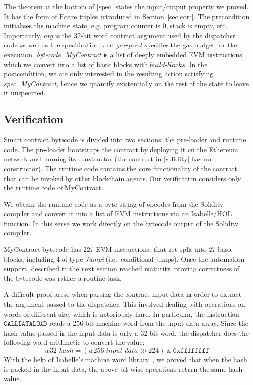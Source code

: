 \documentclass[sigplan,10pt,review]{acmart}\settopmatter{printfolios=true,printccs=false,printacmref=false}
\newcommand{\gaspred}{\mathit{gas\mbox{-}pred}}
\newcommand{\instr}[1]{\mathtt{#1}}
\newcommand{\bblocks}{\mathit{build\mbox{-}blocks}}
\begin{document}
The theorem at the bottom of \autoref{spec} states the input/output 
property we proved. It has the form of Hoare triples introduced in Section~\ref{sec:corr}.
The precondition initialises the machine state, e.g. program counter is $0$,
stack is empty, etc. Importantly, \textit{arg} is the 32-bit word contract
argument used by the dispatcher code as well as the specification,
and $\gaspred$ specifies the gas budget for the execution.
\textit{bytecode\_MyContract} is a list of deeply embedded EVM
instructions which we convert into a list of basic blocks with $\bblocks$.
In the postcondition, we are only interested in the resulting action
satisfying \textit{spec\_MyContract}, hence we quantify existentially
on the rest of the state to leave it unspecified.

\subsection{Verification}


Smart contract bytecode is divided into two sections: the pre-loader and
runtime code.
The pre-loader bootstraps the contract by deploying it on the
Ethereum network and running its constructor (the contract in \autoref{solidity}
has no constructor).
The runtime code contains the core functionality of the contract
that can be invoked by other blockchain agents.
Our verification considers only the runtime code of MyContract.

We obtain the runtime code as a byte string of opcodes from the Solidity
compiler and convert it into a list of EVM instructions via an
Isabelle/HOL function.
In this sense we work directly on the bytecode output of
the Solidity compiler.

MyContract bytecode has 227 EVM instructions, that get split into 27 basic
blocks, including 4 of type \textit{Jumpi} (i.e.\ conditional jumps).
Once the automation support, described in the next section reached maturity,
proving correctness of the bytecode was rather a routine task. %


A difficult proof arose when parsing the contract input data
in order to extract the argument passed to the dispatcher.
This involved dealing with operations on words of different size,
which is notoriously hard.
In particular, the instruction $\instr{CALLDATALOAD}$ reads a
256-bit machine word from the input data array.
Since the hash value passed in the input data is only a 32-bit word,
the dispatcher does the following word arithmetic to convert the value:
\[
\mathit{w32}\mbox{-}\mathit{hash} = (\mathit{w256}\mbox{-}\mathit{input}\mbox{-}\mathit{data} \gg 224)\ \text{\&}\ \mathtt{0xffffffff}
\]
With the help of Isabelle's machine word library~\cite{Word_Lib-AFP}, we proved that when the hash is packed in the input data,
the above bit-wise operations return the same hash value.
\end{document}
